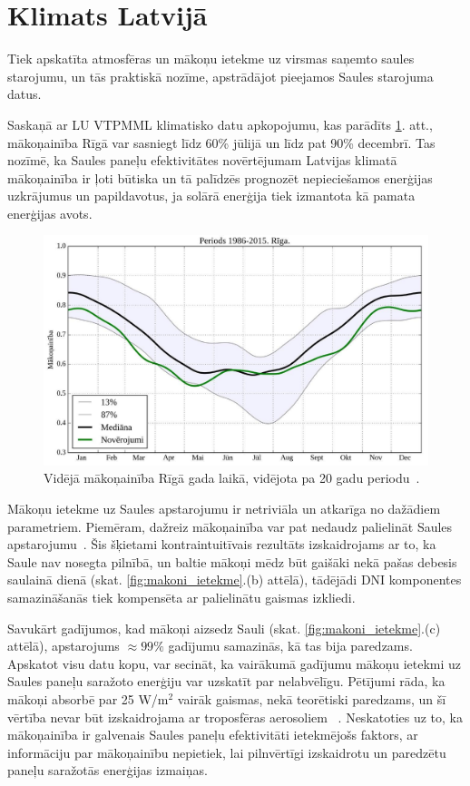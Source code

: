 \section{Klimats Latvijā}

Tiek apskatīta atmosfēras un mākoņu ietekme uz virsmas saņemto saules starojumu, un tās praktiskā nozīme, apstrādājot pieejamos Saules starojuma datus.

Saskaņā ar LU VTPMML klimatisko datu apkopojumu, kas parādīts \ref{fig:makoni_Riga}. att., mākoņainība Rīgā var sasniegt līdz 60\% jūlijā un līdz pat 90\% decembrī. Tas nozīmē, ka Saules paneļu efektivitātes novērtējumam Latvijas klimatā mākoņainība ir ļoti būtiska un tā palīdzēs prognozēt nepieciešamos enerģijas uzkrājumus un papildavotus, ja solārā enerģija tiek izmantota kā pamata enerģijas avots.
\begin{figure}[h]
	\centering
	\includegraphics[width=0.8\linewidth]{figures/misc/makoni_riga.jpg}
	\caption{Vidējā mākoņainība Rīgā gada laikā, vidējota pa 20 gadu periodu~\cite{cloudsModlab}.}
	\label{fig:makoni_Riga}
\end{figure}

Mākoņu ietekme uz Saules apstarojumu ir netriviāla un atkarīga no dažādiem parametriem. Piemēram, dažreiz mākoņainība var pat nedaudz palielināt Saules apstarojumu~\cite{CloudCoverageImpactOnIrradiance}. Šis šķietami kontraintuitīvais rezultāts izskaidrojams ar to, ka Saule nav nosegta pilnībā, un baltie mākoņi mēdz būt gaišāki nekā pašas debesis saulainā dienā (skat. \ref{fig:makoni_ietekme}.(b) attēlā), tādējādi DNI komponentes samazināšanās tiek kompensēta ar palielinātu gaismas izkliedi. 

Savukārt gadījumos, kad mākoņi aizsedz Sauli (skat. \ref{fig:makoni_ietekme}.(c) attēlā), apstarojums $\approx99\%$ gadījumu samazinās, kā tas bija paredzams.
Apskatot visu datu kopu, var secināt, ka vairākumā gadījumu mākoņu ietekmi uz Saules paneļu saražoto enerģiju var uzskatīt par nelabvēlīgu.
Pētījumi rāda, ka mākoņi absorbē par 25 W/m$^2$ vairāk gaismas, nekā teorētiski paredzams, un šī vērtība nevar būt izskaidrojama ar troposfēras aerosoliem ~\cite{observVSModel}. Neskatoties uz to, ka mākoņainība ir galvenais Saules paneļu efektivitāti ietekmējošs faktors, ar informāciju par mākoņainību nepietiek, lai pilnvērtīgi izskaidrotu un paredzētu paneļu saražotās enerģijas izmaiņas.


